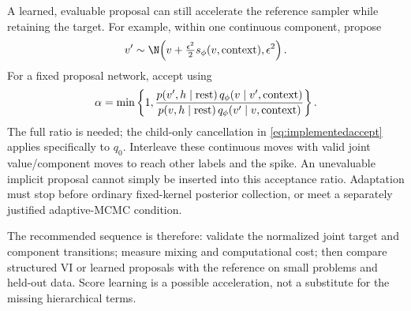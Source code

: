 A learned, evaluable proposal can still accelerate the reference
sampler while retaining the target. For example, within one continuous
component, propose
\[
v'\sim\N\!\left(v+\tfrac{\epsilon^2}2s_\phi(v,{\rm context}),
                  \epsilon^2\right).
\]
For a fixed proposal network, accept using
\begin{equation}
\alpha=\min\left\{1,
\frac{p(v',h\mid{\rm rest})\,q_\phi(v\mid v',{\rm context})}
     {p(v,h\mid{\rm rest})\,q_\phi(v'\mid v,{\rm context})}\right\}.
\end{equation}
The full ratio is needed; the child-only cancellation in
\eqref{eq:implementedaccept} applies specifically to \(q_0\).
Interleave these continuous moves with valid joint value/component moves
to reach other labels and the spike. An unevaluable implicit proposal
cannot simply be inserted into this acceptance ratio. Adaptation must
stop before ordinary fixed-kernel posterior collection, or meet a
separately justified adaptive-MCMC condition.

The recommended sequence is therefore: validate the normalized joint
target and component transitions; measure mixing and computational cost;
then compare structured VI or learned proposals with the reference on
small problems and held-out data. Score learning is a possible
acceleration, not a substitute for the missing hierarchical terms.
